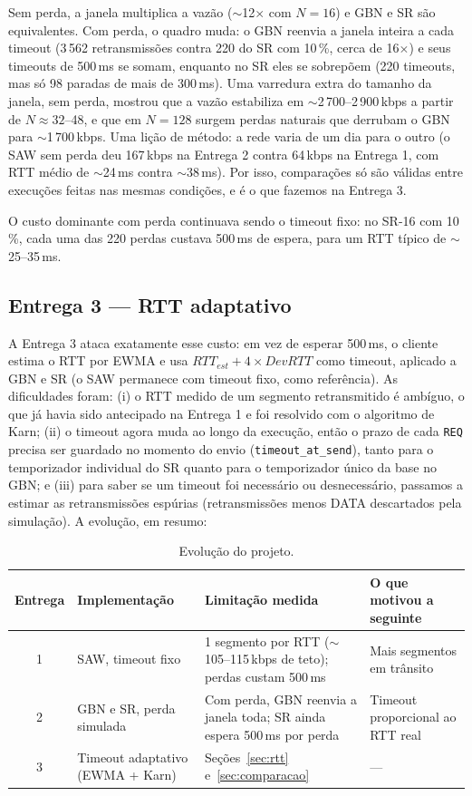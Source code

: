 \documentclass[11pt,a4paper]{article}
\newcommand{\cod}[1]{\textcolor{codverde}{\texttt{\small #1}}}
\begin{document}
Sem perda, a janela multiplica a vazão ($\sim$12$\times$ com $N = 16$) e GBN e SR são equivalentes.
Com perda, o quadro muda: o GBN reenvia a janela inteira a cada timeout (3\,562 retransmissões contra
220 do SR com 10\,\%, cerca de 16$\times$) e seus timeouts de 500\,ms se somam, enquanto no SR eles se
sobrepõem (220 timeouts, mas só 98 paradas de mais de 300\,ms). Uma varredura extra do tamanho da
janela, sem perda, mostrou que a vazão estabiliza em $\sim$2\,700--2\,900\,kbps a partir de
$N \approx 32$--48, e que em $N = 128$ surgem perdas naturais que derrubam o GBN para
$\sim$1\,700\,kbps. Uma lição de método: a rede varia de um dia para o outro (o SAW sem perda deu
167\,kbps na Entrega 2 contra 64\,kbps na Entrega 1, com RTT médio de $\sim$24\,ms contra
$\sim$38\,ms). Por isso, comparações só são válidas entre execuções feitas nas mesmas condições, e é o
que fazemos na Entrega 3.

O custo dominante com perda continuava sendo o timeout fixo: no SR-16 com 10\,\%, cada uma das 220
perdas custava 500\,ms de espera, para um RTT típico de $\sim$25--35\,ms.

\subsection{Entrega 3 --- RTT adaptativo}

A Entrega 3 ataca exatamente esse custo: em vez de esperar 500\,ms, o cliente estima o RTT por EWMA e
usa $\mathit{RTT}_{est} + 4 \times \mathit{DevRTT}$ como timeout, aplicado a GBN e SR (o SAW permanece
com timeout fixo, como referência). As dificuldades foram: (i) o RTT medido de um segmento
retransmitido é ambíguo, o que já havia sido antecipado na Entrega 1 e foi resolvido com o algoritmo
de Karn; (ii) o timeout agora muda ao longo da execução, então o prazo de cada \cod{REQ} precisa ser
guardado no momento do envio (\cod{timeout\_at\_send}), tanto para o temporizador individual do SR
quanto para o temporizador único da base no GBN; e (iii) para saber se um timeout foi necessário ou
desnecessário, passamos a estimar as retransmissões espúrias (retransmissões menos DATA descartados
pela simulação). A evolução, em resumo:

\begin{table}[H]
\centering\small
\caption{Evolução do projeto.}
\label{tab:evolucao}
\begin{tabularx}{\textwidth}{@{}c L L L@{}}
\toprule
\textbf{Entrega} & \textbf{Implementação} & \textbf{Limitação medida} & \textbf{O que motivou a seguinte}\\
 & SAW, timeout fixo & 1 segmento por RTT ($\sim$105--115\,kbps de teto); perdas custam 500\,ms & Mais segmentos em trânsito\\
2 & GBN e SR, perda simulada & Com perda, GBN reenvia a janela toda; SR ainda espera 500\,ms por perda & Timeout proporcional ao RTT real\\
3 & Timeout adaptativo (EWMA + Karn) & Seções~\ref{sec:rtt} e~\ref{sec:comparacao} & ---\\
\bottomrule
\end{tabularx}
\end{table}
\end{document}
